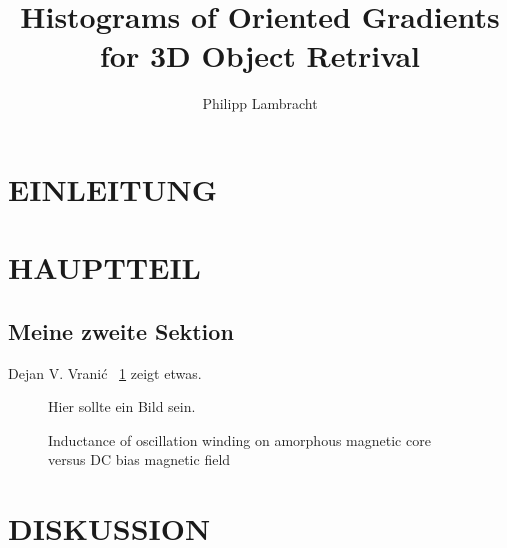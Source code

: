 \documentclass[a4paper, 10pt, conference]{ieeeconf_de}
\title{\LARGE \bf
	Histograms of Oriented Gradients for 3D Object Retrival
}
\author{Philipp Lambracht}
\begin{document}
\maketitle
\thispagestyle{empty}
\pagestyle{empty}



\begin{abstract}

	

\end{abstract}


\section{EINLEITUNG}

	

\section{HAUPTTEIL}



\subsection{Meine zweite Sektion}
 Dejan V. Vrani\'{c}
\figurename~\ref{figurelabel} zeigt etwas.

   \begin{figure}[thpb]
      \centering
			Hier sollte ein Bild sein.
      \caption{Inductance of oscillation winding on amorphous
       magnetic core versus DC bias magnetic field}
      \label{figurelabel}
   \end{figure}

\section{DISKUSSION}

   

\addtolength{\textheight}{-12cm}  %




\end{document}
